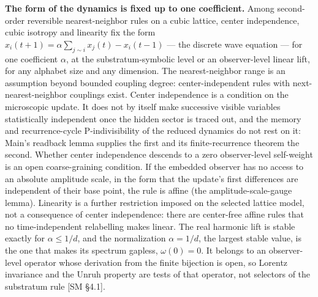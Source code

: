 \documentclass[
]{article}
\begin{document}
\textbf{The form of the dynamics is fixed up to one coefficient.} Among
second-order reversible nearest-neighbor rules on a cubic lattice,
center independence, cubic isotropy and linearity fix the form
\(x_i(t+1)=\alpha\sum_{j\sim i}x_j(t)-x_i(t-1)\) --- the discrete wave
equation --- for one coefficient \(\alpha\), at the substratum-symbolic
level or an observer-level linear lift, for any alphabet size and any
dimension. The nearest-neighbor range is an assumption beyond bounded
coupling degree: center-independent rules with next-nearest-neighbor
couplings exist. Center independence is a condition on the microscopic
update. It does not by itself make successive visible variables
statistically independent once the hidden sector is traced out, and the
memory and recurrence-cycle P-indivisibility of the reduced dynamics do
not rest on it: Main's readback lemma supplies the first and its
finite-recurrence theorem the second. Whether center independence
descends to a zero observer-level self-weight is an open coarse-graining
condition. If the embedded observer has no access to an absolute
amplitude scale, in the form that the update's first differences are
independent of their base point, the rule is affine (the
amplitude-scale-gauge lemma). Linearity is a further restriction imposed
on the selected lattice model, not a consequence of center independence:
there are center-free affine rules that no time-independent relabelling
makes linear. The real harmonic lift is stable exactly for
\(\alpha\le1/d\), and the normalization \(\alpha=1/d\), the largest
stable value, is the one that makes its spectrum gapless,
\(\omega(0)=0\). It belongs to an observer-level operator whose
derivation from the finite bijection is open, so Lorentz invariance and
the Unruh property are tests of that operator, not selectors of the
substratum rule {[}SM §4.1{]}.
\end{document}
